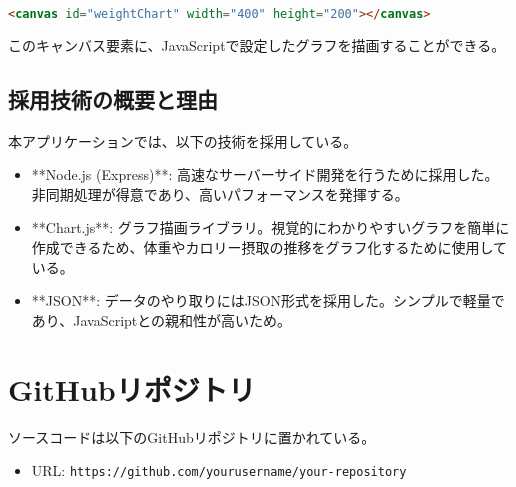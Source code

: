 \documentclass[uplatex,dvipdfmx]{jsarticle}
\begin{document}
\begin{lstlisting}[language=HTML]
<canvas id="weightChart" width="400" height="200"></canvas>
\end{lstlisting}

このキャンバス要素に、JavaScriptで設定したグラフを描画することができる。




\subsection{採用技術の概要と理由}
本アプリケーションでは、以下の技術を採用している。

\begin{itemize}
    \item **Node.js (Express)**: 高速なサーバーサイド開発を行うために採用した。非同期処理が得意であり、高いパフォーマンスを発揮する。
    \item **Chart.js**: グラフ描画ライブラリ。視覚的にわかりやすいグラフを簡単に作成できるため、体重やカロリー摂取の推移をグラフ化するために使用している。
    \item **JSON**: データのやり取りにはJSON形式を採用した。シンプルで軽量であり、JavaScriptとの親和性が高いため。
\end{itemize}

\section{GitHubリポジトリ}
ソースコードは以下のGitHubリポジトリに置かれている。
\begin{itemize}
    \item URL: \texttt{https://github.com/yourusername/your-repository}
\end{itemize}
\end{document}
